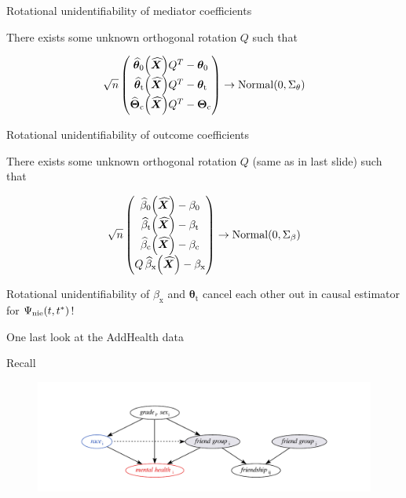 \documentclass{beamer}
\theoremstyle{remark}
\newcommand{\X}{\bm X}
\newcommand{\Xhat}{\widehat{\X}}
\newcommand{\thetazero}{\bm \theta_0}
\newcommand{\thetat}{\bm \theta_\text{t}}
\newcommand{\Thetac}{\bm \Theta_\text{c}}
\newcommand \thetazerohat [1] {\widehat{\bm \theta}_0 \paren*{#1}}
\newcommand \thetathat [1] {\widehat{\bm \theta}_\text{t} \paren*{#1}}
\newcommand \Thetachat [1] {\widehat{\bm \Theta}_\text{c} \paren*{#1}}
\newcommand{\betazero}{\beta_0}
\newcommand{\betat}{\beta_\text{t}}
\newcommand{\betac}{\beta_\text{c}}
\newcommand{\betax}{\beta_\text{x}}
\newcommand \betazerohat [1] {\widehat{\beta}_0 \paren*{#1}}
\newcommand \betathat [1] {\widehat{\beta}_\text{t} \paren*{#1}}
\newcommand \betachat [1] {\widehat{\beta}_\text{c} \paren*{#1}}
\newcommand \betaxhat [1] {\widehat{\beta}_\text{x} \paren*{#1}}
\newcommand{\nie}{\Psi_\text{nie} \paren*{t, t^*}}
\DeclarePairedDelimiter{\paren}{(}{)}
\begin{document}
\begin{frame}{Rotational unidentifiability of mediator coefficients}

    There exists some unknown orthogonal rotation $Q$ such that

    \begin{align*}
        \sqrt n
        \begin{pmatrix}
            \thetazerohat{\Xhat} Q^T - \thetazero \\
            \thetathat{\Xhat} Q^T - \thetat       \\
            \Thetachat{\Xhat} Q^T - \Thetac
        \end{pmatrix}
        \to
        \mathrm{Normal} \paren*{0, \Sigma_\theta}
    \end{align*}
\end{frame}

\begin{frame}{Rotational unidentifiability of outcome coefficients}

    There exists some unknown orthogonal rotation $Q$ (same as in last slide) such that

    \begin{align*}
        \sqrt n
        \begin{pmatrix}
            \betazerohat{\Xhat} - \betazero \\
            \betathat{\Xhat} - \betat       \\
            \betachat{\Xhat} - \betac       \\
            Q \, \betaxhat{\Xhat} - \betax
        \end{pmatrix}
        \to
        \mathrm{Normal} \paren*{0, \Sigma_\beta}
    \end{align*}

    Rotational unidentifiability of $\betax$ and $\thetat$ cancel each other out in causal estimator for $\nie$!
\end{frame}

\begin{frame}{One last look at the AddHealth data}

    Recall

    \begin{figure}
        \centering
        \includegraphics[width=\textwidth]{figures/addhealth-dag.pdf}
        \label{fig:addhealth-dag}
    \end{figure}


\end{frame}
\end{document}
